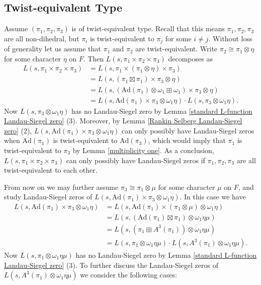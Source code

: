 \documentclass[12pt]{amsart}
\newcommand{\Ad}{\text{Ad}}
\begin{document}
\subsection{Twist-equivalent Type}
Assume $(\pi_1,\pi_2,\pi_3)$ is of twist-equivalent type. Recall that this means $\pi_1,\pi_2,\pi_3$ are all non-dihedral, but $\pi_i$ is twist-equivalent to $\pi_j$ for some $i \neq j$. Without loss of generality let us assume that $\pi_1$ and $\pi_2$ are twist-equivalent. Write $\pi_2 \cong \pi_1 \otimes \eta$ for some character $\eta$ on $F$. Then $L(s,\pi_1 \times \pi_2 \times \pi_3)$ decomposes as 
\begin{align*}
    L(s,\pi_1 \times \pi_2 \times \pi_3) &= L(s,\pi_1 \times (\pi_1 \otimes \eta) \times \pi_3) \\
    &= L(s,(\pi_1 \boxtimes \pi_1) \times \pi_3 \otimes \eta) \\
    &= L(s,(\Ad(\pi_1) \otimes \omega_1 \boxplus \omega_1) \times \pi_3 \otimes \eta) \\
    &= L(s,\Ad(\pi_1) \times \pi_3 \otimes \omega_1\eta) \cdot L(s,\pi_3 \otimes \omega_1\eta).
\end{align*}
Now $L(s,\pi_3 \otimes \omega_1\eta)$ has no Landau-Siegel zero by Lemma \ref{standard L-function Landau-Siegel zero} (3). Moreover, by Lemma \ref{Rankin Selberg Landau-Siegel zero} (2), $L(s,\Ad(\pi_1) \times \pi_3 \otimes \omega_1\eta)$ can only possibly have Landau-Siegel zeros when $\Ad(\pi_1)$ is twist-equivalent to $\Ad(\pi_3)$, which would imply that $\pi_1$ is twist-equivalent to $\pi_3$ by Lemma \ref{multiplicity one}. As a conclusion, $L(s,\pi_1 \times \pi_2 \times \pi_3)$ can only possibly have Landau-Siegel zeros if $\pi_1,\pi_2,\pi_3$ are all twist-equivalent to each other. 

From now on we may further assume $\pi_3 \cong \pi_1 \otimes \mu$ for some character $\mu$ on $F$, and study Landau-Siegel zeros of $L(s,\Ad(\pi_1) \times \pi_3 \otimes \omega_1\eta)$. In this case we have
\begin{align*}
    L(s,\Ad(\pi_1) \times \pi_3 \otimes \omega_1\eta) &= L(s,\Ad(\pi_1) \times (\pi_1 \otimes \mu) \otimes \omega_1\eta) \\
    &= L(s,(\Ad(\pi_1) \boxtimes \pi_1) \otimes \omega_1\eta\mu) \\
    &= L(s,(\pi_1 \boxplus A^3(\pi_1)) \otimes \omega_1\eta\mu) \\
    &= L(s,\pi_1 \otimes \omega_1\eta\mu) \cdot L(s,A^3(\pi_1) \otimes \omega_1\eta \mu).
\end{align*}
Now $L(s,\pi_1 \otimes \omega_1\eta\mu)$ has no Landau-Siegel zero by Lemma \ref{standard L-function Landau-Siegel zero} (3). To further discuss the Landau-Siegel zeros of $L(s,A^3(\pi_1) \otimes \omega_1\eta\mu)$ we consider the following cases:
\end{document}
